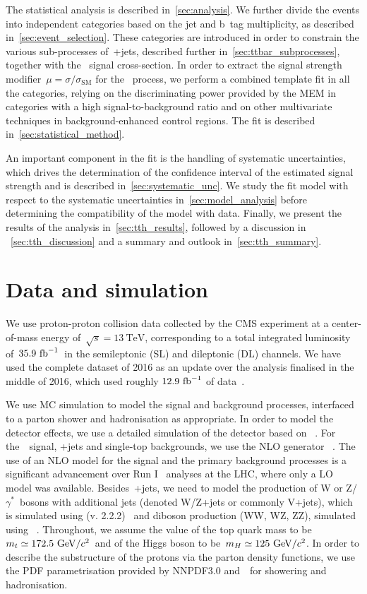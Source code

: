 The statistical analysis is described in~\cref{sec:analysis}. We further divide the events into independent categories based on the jet and b~tag multiplicity, as described in~\cref{sec:event_selection}. These categories are introduced in order to constrain the various sub-processes of~\ttbar+jets, described further in~\cref{sec:ttbar_subprocesses}, together with the \ttH~signal cross-section. In order to extract the signal strength modifier~$\mu = \sigma/\sigma_{\mathrm{SM}}$ for the \ttH~process, we perform a combined template fit in all the categories, relying on the discriminating power provided by the MEM in categories with a high signal-to-background ratio and on other multivariate techniques in background-enhanced control regions. The fit is described in~\cref{sec:statistical_method}.

An important component in the fit is the handling of systematic uncertainties, which drives the determination of the confidence interval of the estimated signal strength and is described in~\cref{sec:systematic_unc}. We study the fit model with respect to the systematic uncertainties in~\cref{sec:model_analysis} before determining the compatibility of the model with data. Finally, we present the results of the analysis in~\cref{sec:tth_results}, followed by a discussion in ~\cref{sec:tth_discussion} and a summary and outlook in~\cref{sec:tth_summary}.

\section{Data and simulation}
\label{sec:data_mc}

We use proton-proton collision data collected by the CMS experiment at a center-of-mass energy of~$\sqrt{s} = 13~\mathrm{TeV}$, corresponding to a total integrated luminosity of~$35.9~\mathrm{fb}^{-1}$~in the semileptonic (SL) and dileptonic (DL) channels. We have used the complete dataset of 2016 as an update over the analysis finalised in the middle of 2016, which used roughly $12.9~\mathrm{fb}^{-1}$ of data~\cite{CMS:2016zbb}.

We use MC simulation to model the signal and background processes, interfaced to a parton shower and hadronisation as appropriate. In order to model the detector effects, we use a detailed simulation of the detector based on \geant~\cite{Agostinelli:2002hh}. For the~\ttH~signal, \ttbar+jets and single-top backgrounds, we use the NLO generator \powheg~\cite{Frixione:2007vw,Re:2010bp}. The use of an NLO model for the signal and the primary background processes is a significant advancement over Run I \ttH~analyses at the LHC, where only a LO model was available. Besides~\ttbar+jets, we need to model the production of W or Z/$\gamma^*$~bosons with additional jets (denoted W/Z+jets or commonly V+jets), which is simulated using \madgraphatnlo (v. 2.2.2)~\cite{Hirschi:2011pa} and diboson production (WW, WZ, ZZ), simulated using \pythia~\cite{Sjostrand:2007gs}. Throughout, we assume the value of the top quark mass to be~$m_t \simeq 172.5~\mathrm{GeV}/c^2$~and of the Higgs boson to be~$m_H \simeq 125~\mathrm{GeV}/c^2$. In order to describe the substructure of the protons via the parton density functions, we use the PDF parametrisation provided by NNPDF3.0 and~\pythia~for showering and hadronisation.

